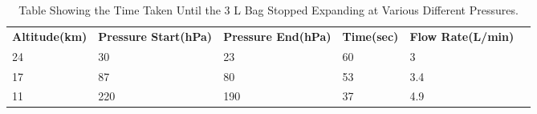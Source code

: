\begin{table}[H]
\centering

\begin{tabular}{|l|l|l|l|l|l}
\cline{1-5}
\textbf{{\small Altitude(km)}}\par & \textbf{{\small Pressure Start(hPa)}}\par & \textbf{{\small Pressure End(hPa)}}\par & \textbf{{\small Time(sec)}}\par & \textbf{{\small Flow Rate(L/min)}}\par &  \\ \cline{1-5}
24 & 30 & 23 & 60 & 3 &  \\ \cline{1-5}
17 & 87 & 80 & 53 & 3.4 &  \\ \cline{1-5}
11 & 220 & 190 & 37 & 4.9 &  \\ \cline{1-5}
\end{tabular}
\caption{Table Showing the Time Taken Until the 3 L Bag Stopped Expanding at Various Different Pressures.}
\label{tab:pump-low-pressure-result}
\end{table}

\raggedbottom